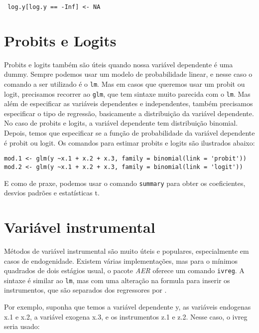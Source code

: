 \documentclass[
]{book}
\begin{document}
\begin{verbatim}
 log.y[log.y == -Inf] <- NA
\end{verbatim}

\hypertarget{probits-e-logits}{%
\section{Probits e Logits}\label{probits-e-logits}}

Probits e logits também são úteis quando nossa variável dependente é uma dummy. Sempre podemos usar um modelo de probabilidade linear, e nesse caso o comando a ser utilizado é o \texttt{lm}. Mas em casos que queremos usar um probit ou logit, precisamos recorrer ao \texttt{glm}, que tem sintaxe muito parecida com o \texttt{lm}. Mas além de especificar as variáveis dependentes e independentes, também precisamos especificar o tipo de regressão, basicamente a distribuição da variável dependente. No caso de probits e logits, a variável dependente tem distribuição binomial. Depois, temos que especificar se a função de probabilidade da variável dependente é probit ou logit. Os comandos para estimar probits e logits são ilustrados abaixo:

\begin{verbatim}
mod.1 <- glm(y ~x.1 + x.2 + x.3, family = binomial(link = 'probit'))
mod.2 <- glm(y ~x.1 + x.2 + x.3, family = binomial(link = 'logit'))
\end{verbatim}

E como de praxe, podemos usar o comando \texttt{summary} para obter os coeficientes, desvios padrões e estatísticas t.

\hypertarget{variuxe1vel-instrumental}{%
\section{Variável instrumental}\label{variuxe1vel-instrumental}}

Métodos de variável instrumental são muito úteis e populares, especialmente em casos de endogenidade. Existem várias implementações, mas para o mínimos quadrados de dois estágios usual, o pacote \emph{AER} oferece um comando \texttt{ivreg}. A sintaxe é similar ao \texttt{lm}, mas com uma alteração na formula para inserir os instrumentos, que são separados dos regressores por \textbar.

Por exemplo, suponha que temos a variável dependente y, as variáveis endogenas x.1 e x.2, a variável exogena x.3, e os instrumentos z.1 e z.2. Nesse caso, o ivreg seria usado:
\end{document}
